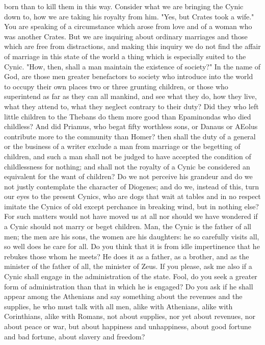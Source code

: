 \documentclass[a4paper]{article}
\begin{document}
born than to kill them in this way. Consider what we are bringing the Cynic
down to, how we are taking his royalty from him. "Yes, but Crates took a wife."
You are speaking of a circumstance which arose from love and of a woman who was
another Crates. But we are inquiring about ordinary marriages and those which
are free from distractions, and making this inquiry we do not find the affair
of marriage in this state of the world a thing which is especially suited to
the Cynic.
    "How, then, shall a man maintain the existence of society?" In the name of
God, are those men greater benefactors to society who introduce into the world
to occupy their own places two or three grunting children, or those who
superintend as far as they can all mankind, and see what they do, how they
live, what they attend to, what they neglect contrary to their duty? Did they
who left little children to the Thebans do them more good than Epaminondas who
died childless? And did Priamus, who begat fifty worthless sons, or Danaus or
AEolus contribute more to the community than Homer? then shall the duty of a
general or the business of a writer exclude a man from marriage or the
begetting of children, and such a man shall not be judged to have accepted the
condition of childlessness for nothing; and shall not the royalty of a Cynic be
considered an equivalent for the want of children? Do we not perceive his
grandeur and do we not justly contemplate the character of Diogenes; and do we,
instead of this, turn our eyes to the present Cynics, who are dogs that wait at
tables and in no respect imitate the Cynics of old except perchance in breaking
wind, but in nothing else? For such matters would not have moved us at all nor
should we have wondered if a Cynic should not marry or beget children. Man, the
Cynic is the father of all men; the men are his sons, the women are his
daughters: he so carefully visits all, so well does he care for all. Do you
think that it is from idle impertinence that he rebukes those whom he meets? He
does it as a father, as a brother, and as the minister of the father of all,
the minister of Zeus.
    If you please, ask me also if a Cynic shall engage in the administration of
the state. Fool, do you seek a greater form of administration than that in
which he is engaged? Do you ask if he shall appear among the Athenians and say
something about the revenues and the supplies, he who must talk with all men,
alike with Athenians, alike with Corinthians, alike with Romans, not about
supplies, nor yet about revenues, nor about peace or war, but about happiness
and unhappiness, about good fortune and bad fortune, about slavery and freedom?
\end{document}
